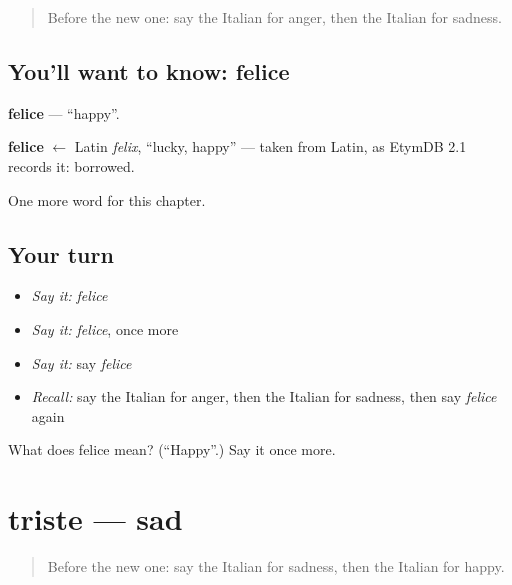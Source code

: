 \label{lesson:IT-C43-felice}



\begin{quote}
Before the new one: say the Italian for anger, then the Italian for sadness.
\end{quote}

\subsection*{You'll want to know: felice}
\textbf{felice} — \textquotedblleft{}happy\textquotedblright{}.

\begin{cousinweb}
\textbf{felice} $\leftarrow$ Latin \emph{felix}, \textquotedblleft{}lucky, happy\textquotedblright{} — taken from Latin, as EtymDB 2.1 records it: borrowed.
\end{cousinweb}

\begin{grammarlens}[title={What you've built}]
One more word for this chapter.
\end{grammarlens}

\subsection*{Your turn}
\begin{itemize}
\raggedright
  \item \emph{Say it:} \emph{felice}
  \item \emph{Say it:} \emph{felice}, once more
  \item \emph{Say it:} say \emph{felice}
  \item \emph{Recall:} say the Italian for anger, then the Italian for sadness, then say \emph{felice} again
\end{itemize}

\begin{tcolorbox}[breakable,colback=teal!4,colframe=teal!35!black,title={Before you move on}]
What does felice mean? (\textquotedblleft{}Happy\textquotedblright{}.) Say it once more.
\end{tcolorbox}
\section[triste]{triste — sad}

\label{lesson:IT-C43-triste}



\begin{quote}
Before the new one: say the Italian for sadness, then the Italian for happy.
\end{quote}

